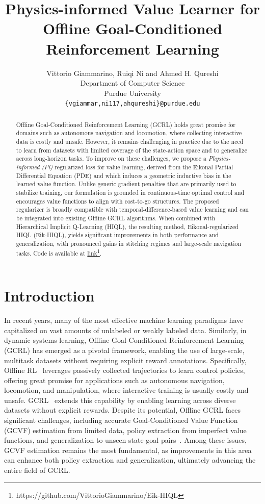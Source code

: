 \documentclass{article}
\title{Physics-informed Value Learner for Offline Goal-Conditioned Reinforcement Learning}
\author{%
  Vittorio Giammarino, Ruiqi Ni and Ahmed H. Qureshi \\
  Department of Computer Science\\
  Purdue University\\
  \texttt{\{vgiammar,ni117,ahqureshi\}@purdue.edu} 
}
\theoremstyle{plain}
\theoremstyle{definition}
\theoremstyle{remark}
\begin{document}
\maketitle

\begin{abstract}
    Offline Goal-Conditioned Reinforcement Learning (GCRL) holds great promise for domains such as autonomous navigation and locomotion, where collecting interactive data is costly and unsafe. However, it remains challenging in practice due to the need to learn from datasets with limited coverage of the state-action space and to generalize across long-horizon tasks. To improve on these challenges, we propose a \emph{Physics-informed (Pi)} regularized loss for value learning, derived from the Eikonal Partial Differential Equation (PDE) and which induces a geometric inductive bias in the learned value function. Unlike generic gradient penalties that are primarily used to stabilize training, our formulation is grounded in continuous-time optimal control and encourages value functions to align with cost-to-go structures. The proposed regularizer is broadly compatible with temporal-difference-based value learning and can be integrated into existing Offline GCRL algorithms. When combined with Hierarchical Implicit Q-Learning (HIQL), the resulting method, Eikonal-regularized HIQL (Eik-HIQL), yields significant improvements in both performance and generalization, with pronounced gains in stitching regimes and large-scale navigation tasks. Code is available at \href{https://github.com/VittorioGiammarino/Eik-HIQL}{link}\footnote{https://github.com/VittorioGiammarino/Eik-HIQL}.
\end{abstract}

\section{Introduction}
In recent years, many of the most effective machine learning paradigms have capitalized on vast amounts of unlabeled or weakly labeled data. Similarly, in dynamic systems learning, Offline Goal-Conditioned Reinforcement Learning (GCRL) has emerged as a pivotal framework, enabling the use of large-scale, multitask datasets without requiring explicit reward annotations. Specifically, Offline RL~\cite{lange2012batch, levine2020offline} leverages passively collected trajectories to learn control policies, offering great promise for applications such as autonomous navigation, locomotion, and manipulation, where interactive training is usually costly and unsafe. GCRL~\cite{kaelbling1993learning, schaul2015universal} extends this capability by enabling learning across diverse datasets without explicit rewards. Despite its potential, Offline GCRL faces significant challenges, including accurate Goal-Conditioned Value Function (GCVF) estimation from limited data, policy extraction from imperfect value functions, and generalization to unseen state-goal pairs~\cite{park2024value}. Among these issues, GCVF estimation remains the most fundamental, as improvements in this area can enhance both policy extraction and generalization, ultimately advancing the entire field of GCRL.
\end{document}
